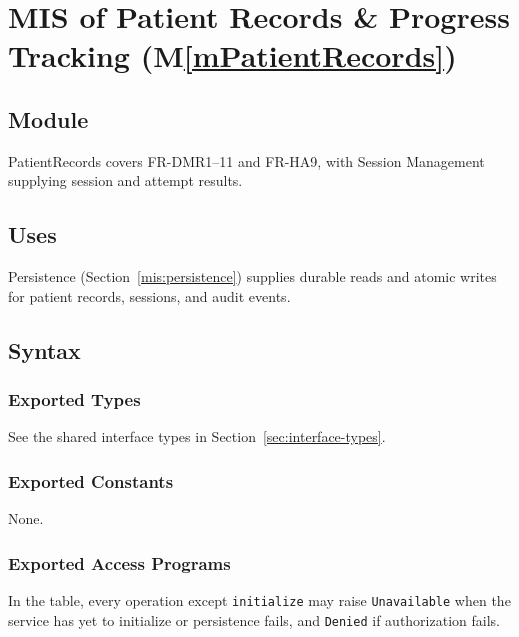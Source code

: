 \documentclass[12pt, titlepage]{article}
\newcommand{\mref}[1]{M\ref{#1}}
\begin{document}
\clearpage

\section{MIS of Patient Records \& Progress Tracking (\mref{mPatientRecords})} \label{mis:records}

\subsection{Module}
PatientRecords covers FR-DMR1--11 and FR-HA9, with Session Management supplying
session and attempt results.

\subsection{Uses}
Persistence (Section~\ref{mis:persistence}) supplies durable reads and atomic
writes for patient records, sessions, and audit events.

\subsection{Syntax}

\subsubsection{Exported Types}
See the shared interface types in Section~\ref{sec:interface-types}.

\subsubsection{Exported Constants}
None.

\subsubsection{Exported Access Programs}
In the table, every operation except \texttt{initialize} may raise
\texttt{Unavailable} when the service has yet to initialize or persistence
fails, and \texttt{Denied} if authorization fails.
\end{document}
